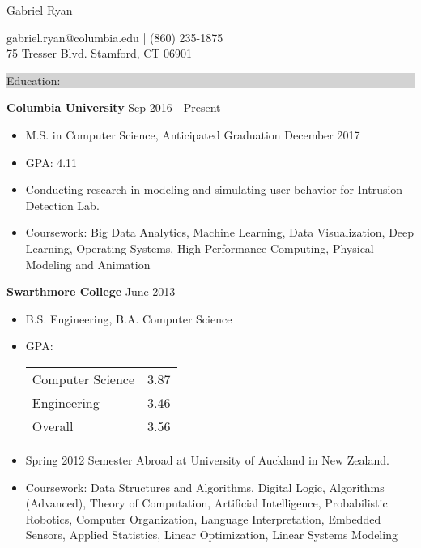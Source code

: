 \documentclass{article} %
\newcommand{\rsection}[1]{
\hspace{-0.4cm}
\colorbox{lightgrey}{
\begin{minipage}{1.07\linewidth}
\vspace{0.25cm}
\fontsize{14pt}{16pt}\selectfont #1 
\vspace{0.15cm}
\end{minipage}
}
\vspace*{-0.2cm}
}
\newcommand{\rjob}[2]{
\vspace{0.1cm}
\hspace*{-0.3cm}  
{\fontsize{10pt}{12pt}\selectfont #1} \hfill #2 
\vspace*{0.1cm} 
\hspace*{-1.2cm}
}
\newenvironment{ritemize}{
\hspace*{-0.8cm} 
\begin{minipage}{1.05\linewidth}
\begin{itemize}
}{
\end{itemize}
\end{minipage}
\vspace{-0.2cm}
}
\newcommand{\ritem}{
\item[-]
}
\begin{document}
\hspace*{-0.45cm} 
{\fontsize{22pt}{22pt}\selectfont Gabriel Ryan}\\
\hspace*{0.3cm} 
\begin{minipage}{\linewidth}
\vspace{0.1cm}
gabriel.ryan@columbia.edu | (860) 235-1875\\
75 Tresser Blvd. Stamford, CT 06901
\end{minipage}
\vspace{-0.15cm}


\rsection{Education:} 

\rjob{\textbf{Columbia University}}{Sep 2016 - Present}\\
\begin{ritemize}
\ritem M.S. in Computer Science, Anticipated Graduation December 2017
\ritem GPA: 4.11
\ritem Conducting research in modeling and simulating user behavior for Intrusion Detection Lab.
\ritem Coursework: Big Data Analytics, Machine Learning, Data Visualization, Deep Learning, Operating Systems, High Performance Computing, Physical Modeling and Animation
\end{ritemize}

\rjob{\textbf{Swarthmore College}}{June 2013}\\
\begin{ritemize}
\ritem B.S. Engineering, B.A. Computer Science
\ritem GPA: \begin{tabular}[t]{lr} Computer Science & 3.87\\
Engineering & 3.46 \\
Overall & 3.56
\end{tabular}
\ritem Spring 2012 Semester Abroad at University of Auckland in New Zealand.
\ritem Coursework: Data Structures and Algorithms, Digital Logic, Algorithms (Advanced), Theory of Computation, Artificial Intelligence, Probabilistic Robotics, Computer Organization,  Language Interpretation, Embedded Sensors, Applied Statistics, Linear Optimization, Linear Systems Modeling
\end{ritemize}
\vspace{0.25cm}
\end{document}
